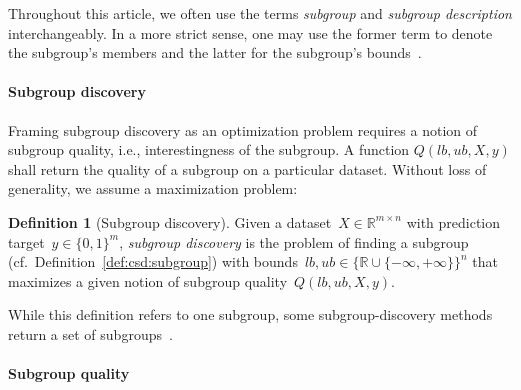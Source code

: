 \documentclass{article}
\theoremstyle{definition}
\newtheorem{definition}{Definition}
\begin{document}
Throughout this article, we often use the terms \emph{subgroup} and \emph{subgroup description} interchangeably.
In a more strict sense, one may use the former term to denote the subgroup's members and the latter for the subgroup's bounds~\cite{atzmueller2015subgroup}.

\paragraph{Subgroup discovery}

Framing subgroup discovery as an optimization problem requires a notion of subgroup quality, i.e., interestingness of the subgroup.
A function $Q(\mathit{lb}, \mathit{ub}, X, y)$ shall return the quality of a subgroup on a particular dataset.
Without loss of generality, we assume a maximization problem:
%
\begin{definition}[Subgroup discovery]
	Given a dataset~$X \in \mathbb{R}^{m \times n}$ with prediction target~$y \in \{0, 1\}^m$,
	\emph{subgroup discovery} is the problem of finding a subgroup (cf.~Definition~\ref{def:csd:subgroup}) with bounds~$\mathit{lb}, \mathit{ub} \in \{\mathbb{R} \cup \{-\infty, +\infty\}\}^n$ that maximizes a given notion of subgroup quality~$Q(\mathit{lb}, \mathit{ub}, X, y)$.
	\label{def:csd:subgroup-discovery}
\end{definition}
%
While this definition refers to one subgroup, some subgroup-discovery methods return a set of subgroups~\cite{atzmueller2015subgroup}.

\paragraph{Subgroup quality}
\end{document}
